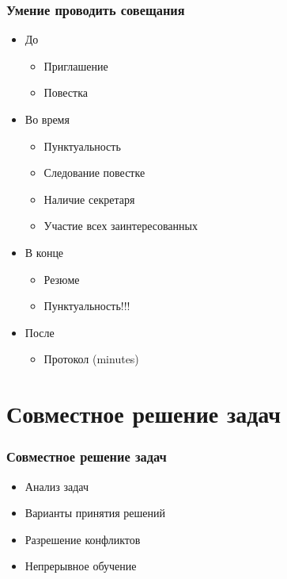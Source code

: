 \documentclass{../../slides-style}
\begin{document}
    \begin{frame}
        \frametitle{Умение проводить совещания}
        \begin{itemize}
            \item До
            \begin{itemize}
                \item Приглашение
                \item Повестка
            \end{itemize}
            \item Во время
            \begin{itemize}
                \item Пунктуальность
                \item Следование повестке
                \item Наличие секретаря
                \item Участие всех заинтересованных
            \end{itemize}
            \item В конце
            \begin{itemize}
                \item Резюме
                \item Пунктуальность!!!
            \end{itemize}
            \item После
            \begin{itemize}
                \item Протокол (minutes)
            \end{itemize}
        \end{itemize}
    \end{frame}

    \section{Совместное решение задач}

    \begin{frame}
        \frametitle{Совместное решение задач}
        \begin{itemize}
            \item Анализ задач
            \item Варианты принятия решений
            \item Разрешение конфликтов
            \item Непрерывное обучение
        \end{itemize}
    \end{frame}
\end{document}
